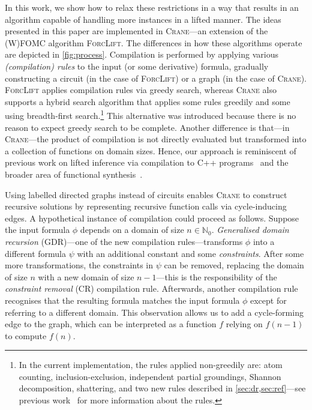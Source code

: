 \documentclass{article}
\begin{document}


In this work, we show how to relax these restrictions in a way that results in
an algorithm capable of handling more instances in a lifted manner. The ideas
presented in this paper are implemented in \textsc{Crane}---an extension of the
(W)FOMC algorithm \textsc{ForcLift}. The differences in how these algorithms
operate are depicted in \cref{fig:process}. Compilation is performed by applying
various \emph{(compilation) rules} to the input (or some derivative) formula,
gradually constructing a circuit (in the case of \textsc{ForcLift}) or a graph
(in the case of \textsc{Crane}). \textsc{ForcLift} applies compilation rules via
greedy search, whereas \textsc{Crane} also supports a hybrid search algorithm
that applies some rules greedily and some using breadth-first
search.\footnote{In the current implementation, the rules applied non-greedily
  are: atom counting, inclusion-exclusion, independent partial groundings,
  Shannon decomposition, shattering, and two new rules described in
  \cref{sec:dr,sec:ref}---see previous work~\cite{DBLP:conf/ijcai/BroeckTMDR11}
  for more information about the rules.} This alternative was introduced because
there is no reason to expect greedy search to be complete. Another difference is
that---in \textsc{Crane}---the product of compilation is not directly evaluated
but transformed into a collection of functions on domain sizes. Hence, our
approach is reminiscent of previous work on lifted inference via compilation to
C++ programs~\cite{DBLP:conf/kr/KazemiP16} and the broader area of functional
synthesis~\cite{DBLP:conf/cav/GoliaRM20,DBLP:conf/pldi/KuncakMPS10,sanathanan1963transfer}.


Using labelled directed graphs instead of circuits enables \textsc{Crane} to
construct recursive solutions by representing recursive function calls via
cycle-inducing edges. A hypothetical instance of compilation could proceed as
follows. Suppose the input formula $\phi$ depends on a domain of size
$n \in \mathbb{N}_{0}$. \emph{Generalised domain recursion} (GDR)---one of the
new compilation rules---transforms $\phi$ into a different formula $\psi$ with
an additional constant and some \emph{constraints}. After some more
transformations, the constraints in $\psi$ can be removed, replacing the domain
of size $n$ with a new domain of size $n-1$---this is the responsibility of the
\emph{constraint removal} (CR) compilation rule. Afterwards, another compilation
rule recognises that the resulting formula matches the input formula $\phi$
except for referring to a different domain. This observation allows us to add a
cycle-forming edge to the graph, which can be interpreted as a function $f$
relying on $f(n-1)$ to compute $f(n)$.
\end{document}
